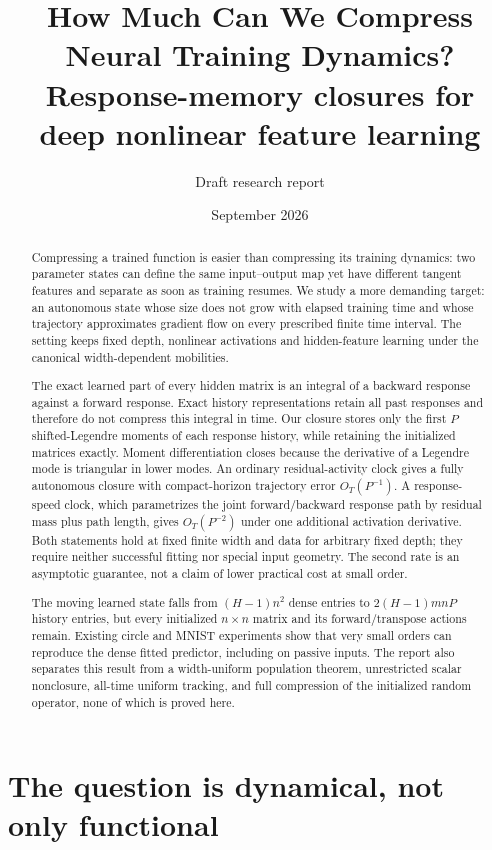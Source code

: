 \documentclass[11pt]{article}
\title{How Much Can We Compress Neural Training Dynamics?\\
\large Response-memory closures for deep nonlinear feature learning}
\author{Draft research report}
\date{September 2026}
\theoremstyle{definition}
\theoremstyle{remark}
\begin{document}
\maketitle

\begin{abstract}
Compressing a trained function is easier than compressing its training dynamics:
two parameter states can define the same input--output map yet have different
tangent features and separate as soon as training resumes.  We study a more
demanding target: an autonomous state whose size does not grow with elapsed
training time and whose trajectory approximates gradient flow on every prescribed
finite time interval.  The setting keeps fixed depth, nonlinear activations and
hidden-feature learning under the canonical width-dependent mobilities.

The exact learned part of every hidden matrix is an integral of a backward
response against a forward response.  Exact history representations retain all
past responses and therefore do not compress this integral in time.  Our closure
stores only the first $P$ shifted-Legendre moments of each response history, while
retaining the initialized matrices exactly.  Moment differentiation closes because
the derivative of a Legendre mode is triangular in lower modes.  An ordinary
residual-activity clock gives a fully autonomous closure with compact-horizon
trajectory error $O_T(P^{-1})$.  A response-speed clock, which parametrizes the
joint forward/backward response path by residual mass plus path length, gives
$O_T(P^{-2})$ under one additional activation derivative.  Both statements hold
at fixed finite width and data for arbitrary fixed depth; they require neither
successful fitting nor special input geometry.  The second rate is an asymptotic
guarantee, not a claim of lower practical cost at small order.

The moving learned state falls from $(H-1)n^2$ dense entries to
$2(H-1)mnP$ history entries, but every initialized $n\times n$ matrix and its
forward/transpose actions remain.  Existing circle and MNIST experiments show
that very small orders can reproduce the dense fitted predictor, including on
passive inputs.  The report also separates this result from a width-uniform
population theorem, unrestricted scalar nonclosure, all-time uniform tracking,
and full compression of the initialized random operator, none of which is proved
here.
\end{abstract}

\section{The question is dynamical, not only functional}
\end{document}
